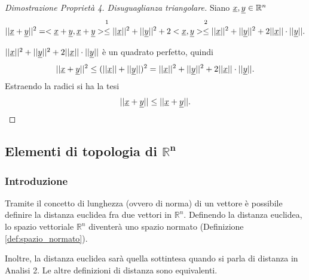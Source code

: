 \begin{proof}[Dimostrazione Proprietà 4. Disuguaglianza triangolare]
    Siano $\uline x,\uline y\in\mathbb R^n$
    \begin{equation*}
        ||\uline x+\uline y||^2=<\uline x+\uline y, \uline x+\uline y>\overset{\footnotemark}{\leq}||\uline x||^2+||\uline y||^2+2<\uline x,\uline y>\overset{\footnotemark}{\leq}||\uline x||^2+||\uline y||^2+2||\uline x||\cdot||\uline y||.
    \end{equation*}
    \addtocounter{footnote}{-1}

    \noindent $||\uline x||^2+||\uline y||^2+2||\uline x||\cdot||\uline y||$ è un \gls{quadrato perfetto}, quindi
    \begin{equation*}
        ||\uline x+\uline y||^2\leq (||\uline x||+||\uline y||)^2=||\uline x||^2+||\uline y||^2+2||\uline x||\cdot||\uline y||.
    \end{equation*}
    Estraendo la radici si ha la tesi
    \begin{equation*}
        ||\uline x+\uline y||\leq ||\uline x+\uline y||.
    \end{equation*}
\end{proof}

\subsection{Elementi di topologia di \texorpdfstring{${\boldsymbol{\mathbb R^n}}$}{Rn}}
\subsubsection{Introduzione}
Tramite il concetto di lunghezza (ovvero di norma) di un vettore è possibile definire la distanza euclidea fra due vettori in $\mathbb R^n$. Definendo la distanza euclidea, lo spazio vettoriale $\mathbb R^n$ diventerà uno \gls{spazio normato} (Definizione \ref{def:spazio_normato}).

Inoltre, la distanza euclidea sarà quella sottintesa quando si parla di distanza in Analisi 2. Le altre definizioni di distanza sono equivalenti. 

